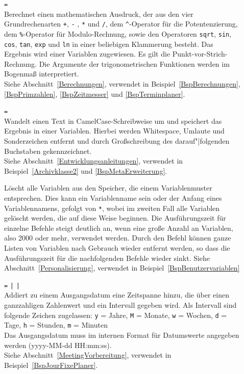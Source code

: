 \begin{description}
\item[]  \verb|=| \\
Berechnet einen mathematischen Ausdruck, der aus den vier Grundrechenarten \verb|+|, \verb|-| , \verb|*| und \verb|/|, dem \verb|^|-Operator für die Potentenzierung, dem \verb|%|-Operator 
für Modulo-Rechnung, sowie den Operatoren \verb|sqrt|, \verb|sin|, \verb|cos|, \verb|tan|, \verb|exp| und \verb|ln| in einer beliebigen Klammerung besteht. Das Ergebnis wird einer Variablen zugewiesen. Es gilt die Punkt-vor-Strich-Rechnung. Die Argumente der trigonometrischen Funktionen werden im Bogenmaß interpretiert.\\
Siehe Abschnitt~\ref{Berechnungen}, verwendet in Beispiel~\ref{BspBerechnungen}, \ref{BspPrimzahlen}, \ref{BspZeitmesser} und \ref{BspTerminplaner}.

\item[]  \verb|=| \\
Wandelt einen Text in CamelCase-Schreibweise um und speichert das Ergebnis in einer Variablen.
Hierbei werden Whitespace, Umlaute und Sonderzeichen entfernt und durch Großschreibung des darauf"|folgenden Buchstaben gekennzeichnet.\\
Siehe Abschnitt~\ref{Entwicklungsanleitungen}, verwendet in Beispiel~\ref{Archivklasse2} und \ref{BspMetaErweiterung}.

\item[] 
Löscht alle Variablen aus den Speicher, die einem Variablenmuster entsprechen. Dies kann ein Variablenname sein oder der Anfang eines Variablennamens, gefolgt von \verb|*|, wobei im zweiten Fall alle Variablen gelöscht werden, die auf diese Weise beginnen. Die Ausführungszeit für einzelne Befehle steigt deutlich an, wenn eine große Anzahl an Variablen, also 2000 oder mehr, verwendet werden. Durch den Befehl können ganze Listen von Variablen nach Gebrauch wieder entfernt werden, so dass die Ausführungszeit für die nachfolgenden Befehle wieder sinkt.
Siehe Abschnitt~\ref{Personalisierung}, verwendet in Beispiel~\ref{BspBenutzervariablen}

\item[]  \verb|=|  \verb=|=  \verb=|= \\
Addiert zu einem Ausgangsdatum eine Zeitspanne hinzu, die über einen ganzzahligen Zahlenwert und ein Intervall gegeben wird. Als Intervall sind folgende Zeichen zugelassen:
\verb|y| = Jahre, \verb|M| = Monate, \verb|w| = Wochen, \verb|d| = Tage, \verb|h| = Stunden, \verb|m| = Minuten\\
Das Ausgangsdatum muss im internen Format für Datumswerte angegeben werden (yyyy-MM-dd HH:mm:ss).\\
Siehe Abschnitt~\ref{MeetingVorbereitung}, verwendet in Beispiel~\ref{BspJourFixePlaner}.


\end{description}
